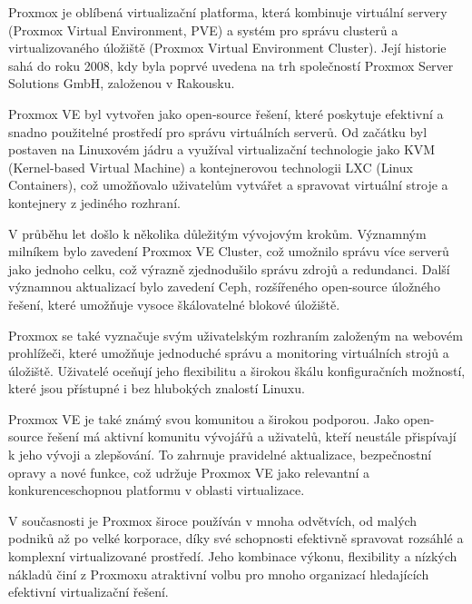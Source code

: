 \label{chapter:predmluva}

Proxmox je oblíbená virtualizační platforma, která kombinuje virtuální servery (Proxmox Virtual Environment, PVE) a systém pro správu clusterů a virtualizovaného úložiště (Proxmox Virtual Environment Cluster). Její historie sahá do roku 2008, kdy byla poprvé uvedena na trh společností Proxmox Server Solutions GmbH, založenou v Rakousku.

Proxmox VE byl vytvořen jako open-source řešení, které poskytuje efektivní a snadno použitelné prostředí pro správu virtuálních serverů. Od začátku byl postaven na Linuxovém jádru a využíval virtualizační technologie jako KVM (Kernel-based Virtual Machine) a kontejnerovou technologii LXC (Linux Containers), což umožňovalo uživatelům vytvářet a spravovat virtuální stroje a kontejnery z jediného rozhraní.

V průběhu let došlo k několika důležitým vývojovým krokům. Významným milníkem bylo zavedení Proxmox VE Cluster, což umožnilo správu více serverů jako jednoho celku, což výrazně zjednodušilo správu zdrojů a redundanci. Další významnou aktualizací bylo zavedení Ceph, rozšířeného open-source úložného řešení, které umožňuje vysoce škálovatelné blokové úložiště.

Proxmox se také vyznačuje svým uživatelským rozhraním založeným na webovém prohlížeči, které umožňuje jednoduché správu a monitoring virtuálních strojů a úložiště. Uživatelé oceňují jeho flexibilitu a širokou škálu konfiguračních možností, které jsou přístupné i bez hlubokých znalostí Linuxu.

Proxmox VE je také známý svou komunitou a širokou podporou. Jako open-source řešení má aktivní komunitu vývojářů a uživatelů, kteří neustále přispívají k jeho vývoji a zlepšování. To zahrnuje pravidelné aktualizace, bezpečnostní opravy a nové funkce, což udržuje Proxmox VE jako relevantní a konkurenceschopnou platformu v oblasti virtualizace.

V současnosti je Proxmox široce používán v mnoha odvětvích, od malých podniků až po velké korporace, díky své schopnosti efektivně spravovat rozsáhlé a komplexní virtualizované prostředí. Jeho kombinace výkonu, flexibility a nízkých nákladů činí z Proxmoxu atraktivní volbu pro mnoho organizací hledajících efektivní virtualizační řešení.